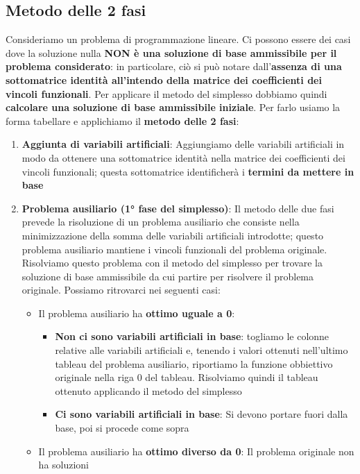 \documentclass[12pt]{article}
\begin{document}
\subsection{Metodo delle 2 fasi}
Consideriamo un problema di programmazione lineare.
Ci possono essere dei casi dove la soluzione nulla \textbf{NON è una soluzione di base ammissibile per il problema considerato}: in particolare,
ciò si può notare dall'\textbf{assenza di una sottomatrice identità all'intendo della matrice dei coefficienti dei vincoli funzionali}.
Per applicare il metodo del simplesso dobbiamo quindi \textbf{calcolare una soluzione di base ammissibile iniziale}.
Per farlo usiamo la forma tabellare e applichiamo il \textbf{metodo delle 2 fasi}:
\begin{enumerate}
    \item \textbf{Aggiunta di variabili artificiali}: Aggiungiamo delle variabili artificiali in modo da ottenere una sottomatrice identità nella matrice dei
    coefficienti dei vincoli funzionali; questa sottomatrice identificherà i \textbf{termini da mettere in base}
    \item \textbf{Problema ausiliario (1° fase del simplesso)}: Il metodo delle due fasi prevede la risoluzione di un problema ausiliario che consiste nella minimizzazione
    della somma delle variabili artificiali introdotte; questo problema ausiliario mantiene i vincoli funzionali del problema originale. Risolviamo questo
    problema con il metodo del simplesso per trovare la soluzione di base ammissibile da cui partire per risolvere il problema originale. Possiamo ritrovarci nei seguenti casi:
    \begin{itemize}
        \item Il problema ausiliario ha \textbf{ottimo uguale a 0}:
        \begin{itemize}
            \item \textbf{Non ci sono variabili artificiali in base}: togliamo le colonne relative alle variabili artificiali e, tenendo i valori ottenuti nell'ultimo tableau del problema ausiliario,
            riportiamo la funzione obbiettivo originale nella riga 0 del tableau. Risolviamo quindi il tableau ottenuto applicando il metodo del simplesso
            \item \textbf{Ci sono variabili artificiali in base}: Si devono portare fuori dalla base, poi si procede come sopra
        \end{itemize}
        \item Il problema ausiliario ha \textbf{ottimo diverso da 0}: Il problema originale non ha soluzioni
    \end{itemize}
\end{enumerate}
\end{document}
